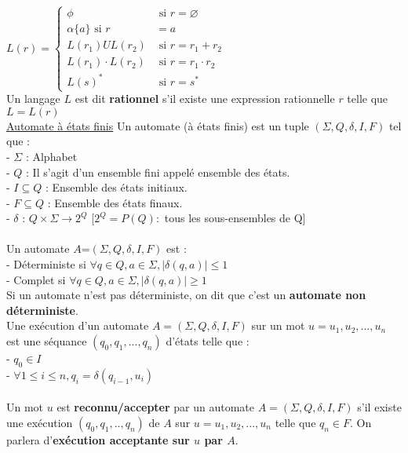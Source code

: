 \documentclass{article}
\begin{document}
    $L(r)=\left\{\begin{array}{ll}
        \phi & \text { si } r=\varnothing \\
        \alpha \{a\} \text { si } r & =a \\
        L\left(r_{1}\right) U L\left(r_{2}\right) & \text { si } r=r_{1}+r_{2} \\
        L\left(r_{1}\right) \cdot L\left(r_{2}\right) & \text { si } r=r_{1} \cdot r_{2} \\
        L(s)^{*} & \text { si } r=s^{*}
        \end{array}\right.$ \\
    Un langage $L$ est dit \textbf{rationnel} s'il existe une expression rationnelle $r$ telle que $L=L(r)$ \\
    \underline{Automate à états finis}
    Un automate (à états finis) est un tuple $(\Sigma,Q,\delta,I,F)$ tel que : \\
    - $\Sigma$ : Alphabet \\
    - $Q$ : Il s'agit d'un ensemble fini appelé ensemble des états. \\ 
    - $I \subseteq Q $ : Ensemble des états initiaux. \\ 
    - $F \subseteq Q $ : Ensemble des états finaux. \\
    - $\delta$ : $Q \times \Sigma \rightarrow 2^Q$ [$2^Q = P(Q) : $ tous les sous-ensembles de Q] \\
    \\
    Un automate $A$=$(\Sigma,Q,\delta,I,F)$ est : \\
    - Déterministe si $\forall q \in Q, a \in \Sigma, \mid \delta(q,a)\mid \le 1$ \\
    - Complet si $\forall q \in Q, a \in \Sigma, \mid \delta(q,a) \mid \ge 1$ \\
    Si un automate n'est pas déterministe, on dit que c'est un \textbf{automate non déterministe}. 
    \\ 
    Une exécution d'un automate $A=(\Sigma,Q,\delta,I,F)$ sur un mot $u=u_1,u_2,...,u_n$ est une séquance $(q_0,q_1,...,q_n)$ d'états telle que : \\
    - $q_0 \in I$ \\
    - $\forall 1 \le i \le n, q_i=\delta(q_{i-1},u_i)$ \\
    \\
    Un mot $u$ est \textbf{reconnu/accepter} par un automate $A=(\Sigma,Q,\delta,I,F)$ s'il existe une exécution $(q_0,q_1,..,q_n)$ de $A$ sur $u=u_1,u_2,...,u_n$ telle que $q_n \in F$. On parlera d'\textbf{exécution acceptante sur $u$ par $A$}. \\
\end{document}
